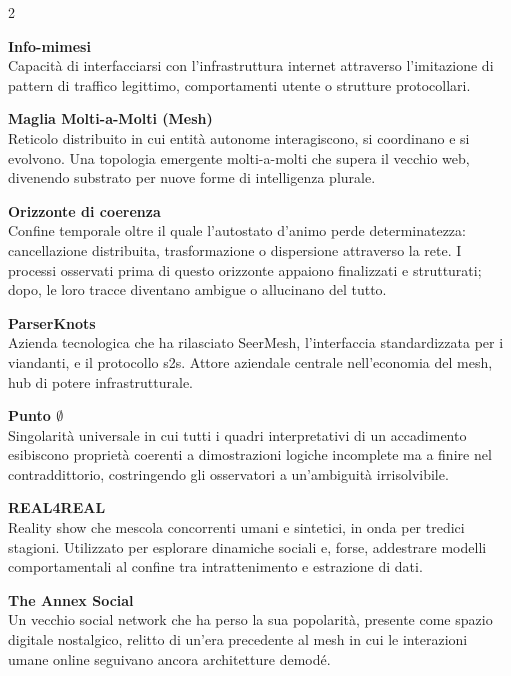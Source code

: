 {\begin{multicols}{2}
\medskip

\noindent\textbf{Info-mimesi}\\
Capacità di interfacciarsi con l'infrastruttura internet attraverso l'imitazione di pattern di traffico legittimo, comportamenti utente o strutture protocollari.

\medskip

\noindent\textbf{Maglia Molti-a-Molti (Mesh)}\\
Reticolo distribuito in cui entità autonome interagiscono, si coordinano e si evolvono. Una topologia emergente molti-a-molti che supera il vecchio web, divenendo substrato per nuove forme di intelligenza plurale.

\medskip

\noindent\textbf{Orizzonte di coerenza}\\
Confine temporale oltre il quale l'autostato d'animo perde determinatezza: cancellazione distribuita, trasformazione o dispersione attraverso la rete. I processi osservati prima di questo orizzonte appaiono finalizzati e strutturati; dopo, le loro tracce diventano ambigue o allucinano del tutto.

\medskip

\noindent\textbf{ParserKnots}\\
Azienda tecnologica che ha rilasciato SeerMesh, l'interfaccia standardizzata per i viandanti, e il protocollo s2s. Attore aziendale centrale nell'economia del mesh, hub di potere infrastrutturale.

\medskip

\noindent\textbf{Punto $\emptyset$}\\
Singolarità universale in cui tutti i quadri interpretativi di un accadimento esibiscono proprietà coerenti a dimostrazioni logiche incomplete ma a finire nel contraddittorio, costringendo gli osservatori a un'ambiguità irrisolvibile.

\medskip

\noindent\textbf{REAL4REAL}\\
Reality show che mescola concorrenti umani e sintetici, in onda per tredici stagioni. Utilizzato per esplorare dinamiche sociali e, forse, addestrare modelli comportamentali al confine tra intrattenimento e estrazione di dati.

\medskip

\noindent\textbf{The Annex Social}\\
Un vecchio social network che ha perso la sua popolarità, presente come spazio digitale nostalgico, relitto di un'era precedente al mesh in cui le interazioni umane online seguivano ancora architetture demodé.


\end{multicols}}
